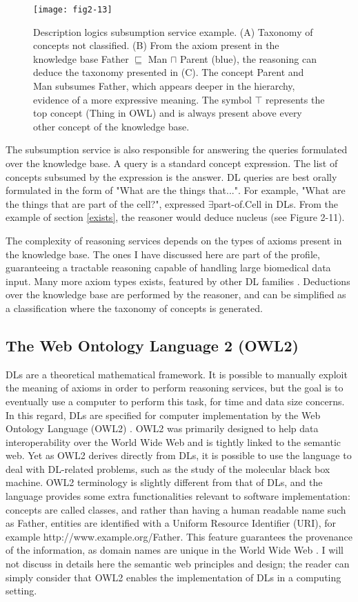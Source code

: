 \begin{figure}[ht]
    \centering
    \texttt{[image: fig2-13]}
    \caption{Description logics subsumption service example. (A) Taxonomy of concepts not classified. (B) From the axiom present in the knowledge base Father $ \sqsubseteq $ Man $ \sqcap $ Parent (blue), the reasoning can deduce the taxonomy presented in (C). The concept Parent and Man subsumes Father, which appears deeper in the hierarchy, evidence of a more expressive meaning. The symbol $ \top $ represents the top concept (Thing in OWL) and is always present above every other concept of the knowledge base.}
    \label{fig2-13}
\end{figure}

The subsumption service is also responsible for answering the queries formulated over the knowledge base. A query is a standard concept expression. The list of concepts subsumed by the expression is the answer. DL queries are best orally formulated in the form of "What are the things that...". For example, "What are the things that are part of the cell?", expressed $ \exists $part-of.Cell in DLs. From the example of section \ref{exists}, the reasoner would deduce nucleus (see Figure 2-11).

The complexity of reasoning services depends on the types of axioms present in the knowledge base. The ones I have discussed here are part of the  profile, guaranteeing a tractable reasoning capable of handling large biomedical data input. Many more axiom types exists, featured by other DL families \citep{krotzsch2012owl}. Deductions over the knowledge base are performed by the reasoner, and can be simplified as a classification where the taxonomy of concepts is generated. 

\subsection{The Web Ontology Language 2 (OWL2)}
DLs are a theoretical mathematical framework. It is possible to manually exploit the meaning of axioms in order to perform reasoning services, but the goal is to eventually use a computer to perform this task, for time and data size concerns. In this regard, DLs are specified for computer implementation by the Web Ontology Language (OWL2) \citep{owlw3c}. OWL2 was primarily designed to help data interoperability over the World Wide Web and is tightly linked to the semantic web. Yet as OWL2 derives directly from DLs, it is possible to use the language to deal with DL-related problems, such as the study of the molecular black box machine. OWL2 terminology is slightly different from that of DLs, and the language provides some extra functionalities relevant to software implementation: concepts are called classes, and rather than having a human readable name such as Father, entities are identified with a Uniform Resource Identifier (URI), for example http://www.example.org/Father. This feature guarantees the provenance of the information, as domain names are unique in the World Wide Web \citep{berners2001semantic}. I will not discuss in details here the semantic web principles and design; the reader can simply consider that OWL2 enables the implementation of DLs in a computing setting.

